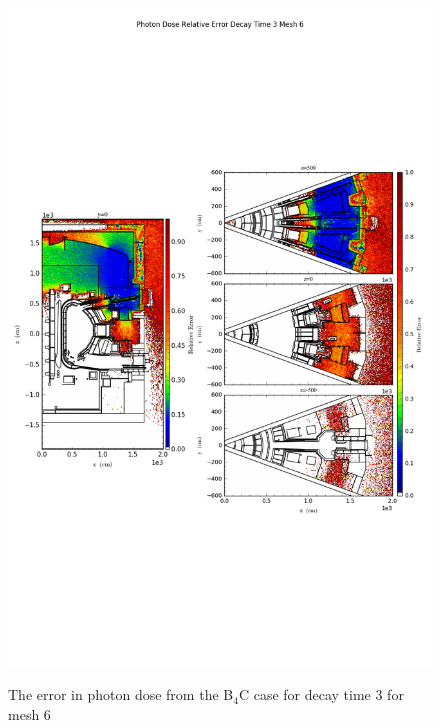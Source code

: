 \begin{figure}[ht!]
\centering
\includegraphics[trim={0cm 9cm 0cm 10cm},clip,scale=0.75]{../plots/final_model_nob4c/Photon_Dose_Relative_Error_Decay_Time_3_Mesh_6.png}
\label{fig:photons_dc3_no4bc_m6_error}
\caption{The error in photon dose from the B$_4$C case for decay time 3 for mesh 6}
\end{figure}
